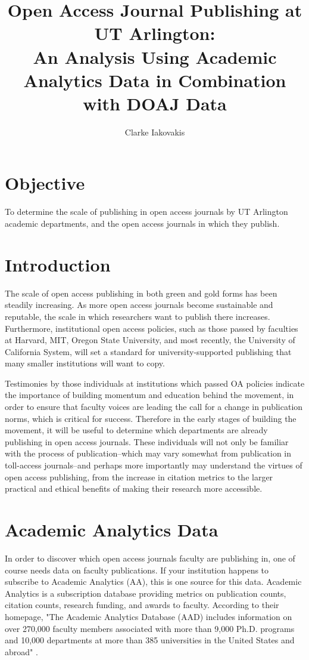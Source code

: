 \documentclass{article}
\begin{document}


\title{\bf Open Access Journal Publishing at UT Arlington: \\ \large An Analysis Using Academic Analytics Data in Combination with DOAJ Data}
\author{Clarke Iakovakis}
\maketitle


\section{Objective}
To determine the scale of publishing in open access journals by UT Arlington academic departments, and the open access journals in which they publish.

\section{Introduction}
The scale of open access publishing in both green and gold forms has been steadily increasing. 
As more open access journals become sustainable and reputable, the scale in which researchers want to publish there increases. 
Furthermore, institutional open access policies, such as those passed by faculties at Harvard, MIT, Oregon State University, and most recently, the University of California System, will set a standard for university-supported publishing that many smaller institutions will want to copy.

Testimonies by those individuals at institutions which passed OA policies indicate the importance of building momentum and education behind the movement, in order to ensure that faculty voices are leading the call for a change in publication norms, which is critical for success. 
Therefore in the early stages of building the movement, it will be useful to determine which departments are already publishing in open access journals. 
These individuals will not only be familiar with the process of publication--which may vary somewhat from publication in toll-access journals--and perhaps more importantly may understand the virtues of open access publishing, from the increase in citation metrics to the larger practical and ethical benefits of making their research more accessible.


\section{Academic Analytics Data}
In order to discover which open access journals faculty are publishing in, one of course needs data on faculty publications. 
If your institution happens to subscribe to Academic Analytics (AA), this is one source for this data. 
Academic Analytics is a subscription database providing metrics on publication counts, citation counts, research funding, and awards to faculty. 
According to their homepage, "The Academic Analytics Database (AAD) includes information on over 270,000 faculty members associated with more than 9,000 Ph.D. programs and 10,000 departments at more than 385 universities in the United States and abroad" \cite{AcadAn}.
\end{document}
